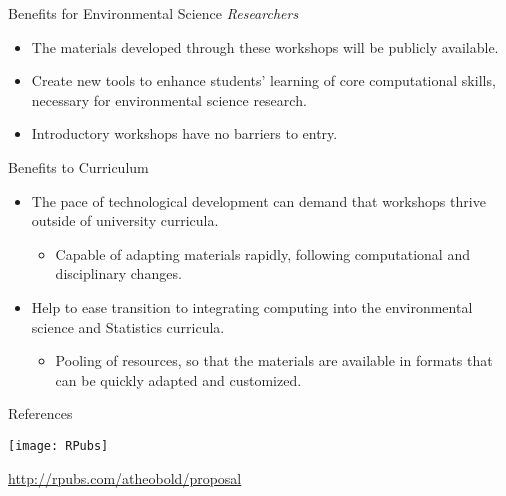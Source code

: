 \documentclass[10pt,ignorenonframetext,]{beamer}
\providecommand{\tightlist}{%
  \setlength{\itemsep}{0pt}\setlength{\parskip}{0pt}}
\begin{document}
\begin{frame}{Benefits for Environmental Science \emph{Researchers}}

\begin{itemize}[<+->]
\item
  The materials developed through these workshops will be publicly
  available.
\item
  Create new tools to enhance students' learning of core computational
  skills, necessary for environmental science research.
\item
  Introductory workshops have no barriers to entry. 
\end{itemize}

\end{frame}

\begin{frame}{Benefits to Curriculum}

\begin{itemize}[<+->]
\tightlist
\item
  The pace of technological development can demand that workshops thrive
  outside of university curricula.

  \begin{itemize}[<+->]
  \tightlist
  \item
    Capable of adapting materials rapidly, following computational and
    disciplinary changes.
  \end{itemize}
\item
  Help to ease transition to integrating computing into the
  environmental science and Statistics curricula.

  \begin{itemize}[<+->]
  \tightlist
  \item
    Pooling of resources, so that the materials are available in formats
    that can be quickly adapted and customized.
  \end{itemize}
\end{itemize}

\end{frame}

\begin{frame}{References}

\begin{center}\texttt{[image: RPubs]} \end{center}

\url{http://rpubs.com/atheobold/proposal}

\end{frame}
\end{document}
